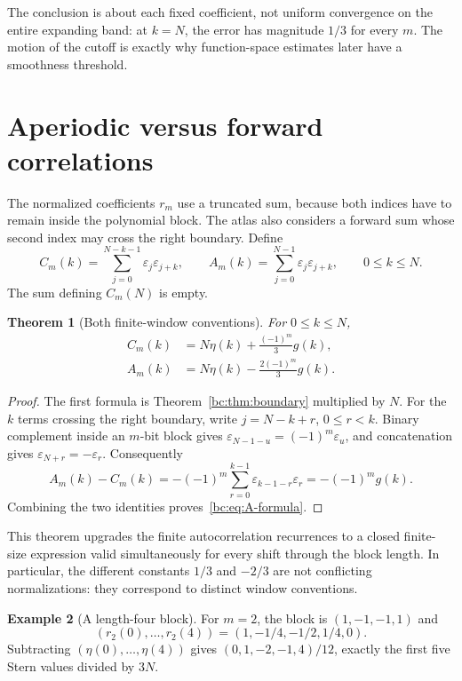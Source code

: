 \documentclass[11pt,a4paper,oneside,openany]{book}
\numberwithin{equation}{chapter}
\newtheorem{theorem}{Theorem}[chapter]
\theoremstyle{definition}
\newtheorem{example}[theorem]{Example}
\theoremstyle{remark}
\newcommand{\eps}{\varepsilon}
\begin{document}
The conclusion is about each fixed coefficient, not uniform convergence on the
entire expanding band: at $k=N$, the error has magnitude $1/3$ for every $m$.
The motion of the cutoff is exactly why function-space estimates later have a
smoothness threshold.

\section{Aperiodic versus forward correlations}
The normalized coefficients $r_m$ use a truncated sum, because both indices have
to remain inside the polynomial block. The atlas also considers a forward sum
whose second index may cross the right boundary. Define
\begin{equation}
 C_m(k)=\sum_{j=0}^{N-k-1}\eps_j\eps_{j+k},\qquad
 A_m(k)=\sum_{j=0}^{N-1}\eps_j\eps_{j+k},\qquad 0\le k\le N.
 \label{bc:eq:two-correlations}
\end{equation}
The sum defining $C_m(N)$ is empty.

\begin{theorem}[Both finite-window conventions]
\label{bc:thm:forward}
For $0\le k\le N$,
\begin{align}
 C_m(k)&=N\eta(k)+\frac{(-1)^m}{3}g(k),\label{bc:eq:C-formula}\\
 A_m(k)&=N\eta(k)-\frac{2(-1)^m}{3}g(k).
 \label{bc:eq:A-formula}
\end{align}
\end{theorem}
\begin{proof}
The first formula is Theorem~\ref{bc:thm:boundary} multiplied by $N$.
For the $k$ terms crossing the right boundary, write $j=N-k+r$, $0\le r<k$.
Binary complement inside an $m$-bit block gives
$\eps_{N-1-u}=(-1)^m\eps_u$, and concatenation gives $\eps_{N+r}=-\eps_r$.
Consequently
\[
 A_m(k)-C_m(k)
 =-(-1)^m\sum_{r=0}^{k-1}\eps_{k-1-r}\eps_r
 =-(-1)^mg(k).
\]
Combining the two identities proves~\eqref{bc:eq:A-formula}.
\end{proof}

This theorem upgrades the finite autocorrelation recurrences to a closed
finite-size expression valid simultaneously for every shift through the block
length. In particular, the different constants $1/3$ and $-2/3$ are not conflicting
normalizations: they correspond to distinct window conventions.

\begin{example}[A length-four block]
For $m=2$, the block is $(1,-1,-1,1)$ and
\[
 (r_2(0),\ldots,r_2(4))=(1,-1/4,-1/2,1/4,0).
\]
Subtracting $(\eta(0),\ldots,\eta(4))$ gives
$(0,1,-2,-1,4)/12$, exactly the first five Stern values divided by $3N$.
\end{example}
\end{document}
